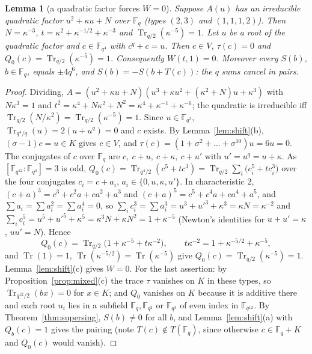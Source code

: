 \documentclass[11pt,a4paper]{amsart}
\newtheorem{lemma}[theorem]{Lemma}
\theoremstyle{definition}
\newcommand{\F}{\mathbb{F}}
\newcommand{\Tr}{\operatorname{Tr}}
\begin{document}
\begin{lemma}[a quadratic factor forces $W=0$]\label{lem:quadfactor}
Suppose $A(u)$ has an irreducible quadratic factor $u^2+\kappa u+N$ over $\F_q$ (types $(2,3)$ and $(1,1,1,2)$). Then $N=\kappa^{-3}$, $t=\kappa^2+\kappa^{-1/2}+\kappa^{-3}$ and $\Tr_{q/2}(\kappa^{-5})=1$. Let $u$ be a root of the quadratic factor and $c\in\F_{q^4}$ with $c^q+c=u$. Then $c\in V$, $\tau(c)=0$ and $Q_0(c)=\Tr_{q/2}(\kappa^{-5})=1$. Consequently $W(t,1)=0$. Moreover every $S(b)$, $b\in\F_q$, equals $\pm4q^6$, and $S(b)=-S(b+T(c))$: the $q$ sums cancel in pairs.
\end{lemma}
\begin{proof}
Dividing, $A=(u^2+\kappa u+N)(u^3+\kappa u^2+(\kappa^2+N)u+\kappa^3)$ with $N\kappa^3=1$ and $t^2=\kappa^4+N\kappa^2+N^2=\kappa^4+\kappa^{-1}+\kappa^{-6}$; the quadratic is irreducible iff $\Tr_{q/2}(N/\kappa^2)=\Tr_{q/2}(\kappa^{-5})=1$. Since $u\in\F_{q^2}$, $\Tr_{q^4/q}(u)=2(u+u^q)=0$ and $c$ exists. By Lemma~\ref{lem:shift}(b), $(\sigma-1)c=u\in K$ gives $c\in V$, and $\tau(c)=(1+\sigma^2+\dots+\sigma^{10})u=6u=0$. The conjugates of $c$ over $\F_q$ are $c,\ c+u,\ c+\kappa,\ c+u'$ with $u'=u^q=u+\kappa$. As $[\F_{q^{12}}:\F_{q^4}]=3$ is odd, $Q_0(c)=\Tr_{q^4/2}(c^5+tc^3)=\Tr_{q/2}\sum_i\bigl(c_i^5+tc_i^3\bigr)$ over the four conjugates $c_i=c+a_i$, $a_i\in\{0,u,\kappa,u'\}$. In characteristic $2$, $(c+a)^3=c^3+c^2a+ca^2+a^3$ and $(c+a)^5=c^5+c^4a+ca^4+a^5$, and $\sum a_i=\sum a_i^2=\sum a_i^4=0$, so $\sum_ic_i^3=\sum a_i^3=u^3+u'^3+\kappa^3=\kappa N=\kappa^{-2}$ and $\sum_ic_i^5=u^5+u'^5+\kappa^5=\kappa^3N+\kappa N^2=1+\kappa^{-5}$ (Newton's identities for $u+u'=\kappa$, $uu'=N$). Hence
\[
Q_0(c)=\Tr_{q/2}\bigl(1+\kappa^{-5}+t\kappa^{-2}\bigr),\qquad t\kappa^{-2}=1+\kappa^{-5/2}+\kappa^{-5},
\]
and $\Tr(1)=1$, $\Tr(\kappa^{-5/2})=\Tr(\kappa^{-5})$ give $Q_0(c)=\Tr_{q/2}(\kappa^{-5})=1$. Lemma~\ref{lem:shift}(c) gives $W=0$. For the last assertion: by Proposition~\ref{prop:mixed}(c) the trace $\tau$ vanishes on $K$ in these types, so $\Tr_{q^{12}/2}(bx)=0$ for $x\in K$; and $Q_0$ vanishes on $K$ because it is additive there and each root $u_i$ lies in a subfield $\F_q,\F_{q^2}$ or $\F_{q^3}$ of even index in $\F_{q^{12}}$. By Theorem~\ref{thm:supersing}, $S(b)\ne0$ for all $b$, and Lemma~\ref{lem:shift}(a) with $Q_b(c)=1$ gives the pairing (note $T(c)\notin T(\F_q)$, since otherwise $c\in\F_q+K$ and $Q_0(c)$ would vanish).
\end{proof}
\end{document}
